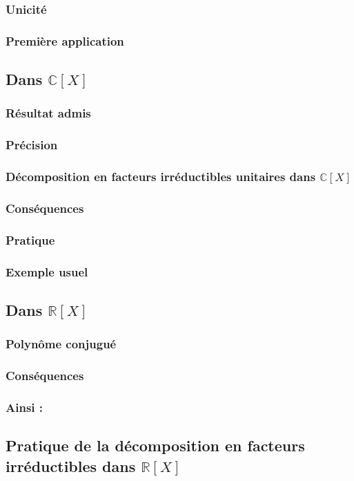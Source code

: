 \documentclass[12pt,a4paper,french]{book}
\begin{document}
			\subsubsection{Unicité}
			\subsubsection{Première application}
		\subsection{Dans $\mathbb{C}[X]$}
			\subsubsection{Résultat admis}
			\subsubsection{Précision}
			\subsubsection{Décomposition en facteurs irréductibles unitaires dans $\mathbb{C}[X]$}
			\subsubsection{Conséquences}
			\subsubsection{Pratique}
			\subsubsection{Exemple usuel}
		\subsection{Dans $\mathbb{R}[X]$}
			\subsubsection{Polynôme conjugué}
			\subsubsection{Conséquences}
			\subsubsection{Ainsi :}
		\subsection{Pratique de la décomposition en facteurs irréductibles dans $\mathbb{R}[X]$}
\end{document}
